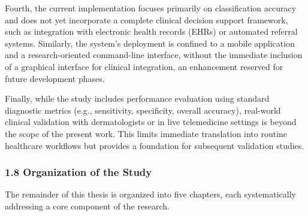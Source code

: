 \documentclass[
  12pt,
  oneside]{article}
\begin{document}
Fourth, the current implementation focuses primarily on classification
accuracy and does not yet incorporate a complete clinical decision
support framework, such as integration with electronic health records
(EHRs) or automated referral systems. Similarly, the system's deployment
is confined to a mobile application and a research-oriented command-line
interface, without the immediate inclusion of a graphical interface for
clinical integration, an enhancement reserved for future development
phases.

Finally, while the study includes performance evaluation using standard
diagnostic metrics (e.g., sensitivity, specificity, overall accuracy),
real-world clinical validation with dermatologists or in live
telemedicine settings is beyond the scope of the present work. This
limits immediate translation into routine healthcare workflows but
provides a foundation for subsequent validation studies.

\subsubsection{1.8 Organization of the
Study}\label{organization-of-the-study}

The remainder of this thesis is organized into five chapters, each
systematically addressing a core component of the research.
\end{document}
